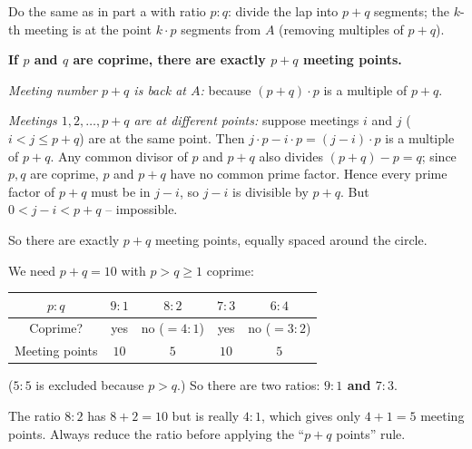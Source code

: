 {
Do the same as in part a with ratio $p:q$: divide the lap into $p+q$ segments; the $k$-th meeting is at the point $k\cdot p$ segments from $A$ (removing multiples of $p+q$).
\begin{proofbox}\textbf{If $p$ and $q$ are coprime, there are exactly $p+q$ meeting points.}\par
\emph{Meeting number $p+q$ is back at $A$:} because $(p+q)\cdot p$ is a multiple of $p+q$.\par
\emph{Meetings $1,2,\dots,p+q$ are at different points:} suppose meetings $i$ and $j$ ($i<j\le p+q$) are at the same point. Then $j\cdot p-i\cdot p=(j-i)\cdot p$ is a multiple of $p+q$. Any common divisor of $p$ and $p+q$ also divides $(p+q)-p=q$; since $p,q$ are coprime, $p$ and $p+q$ have no common prime factor. Hence every prime factor of $p+q$ must be in $j-i$, so $j-i$ is divisible by $p+q$. But $0<j-i<p+q$ -- impossible.\par
So there are exactly $p+q$ meeting points, equally spaced around the circle.\end{proofbox}
We need $p+q=10$ with $p>q\ge 1$ coprime:
\begin{center}
\begin{tabular}{|c|c|c|c|c|}
\hline
\rowcolor{tmBlue!10}$p:q$ & $9:1$ & $8:2$ & $7:3$ & $6:4$\\ \hline
Coprime? & yes & no ($=4:1$) & yes & no ($=3:2$)\\ \hline
Meeting points & $10$ & $5$ & $10$ & $5$\\ \hline
\end{tabular}
\end{center}
($5:5$ is excluded because $p>q$.) So there are two ratios: \textbf{$9:1$ and $7:3$}.
\begin{warnbox}The ratio $8:2$ has $8+2=10$ but is really $4:1$, which gives only $4+1=5$ meeting points. Always reduce the ratio before applying the ``$p+q$ points'' rule.\end{warnbox}
}

